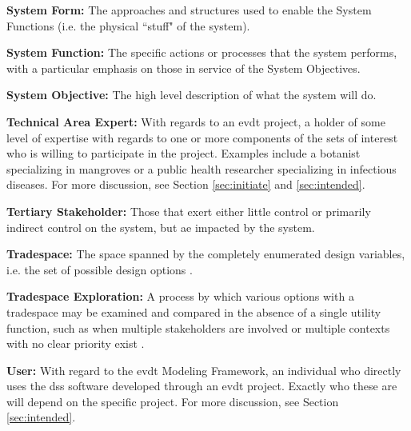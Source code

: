 \textbf{System Form:} The approaches and structures used to enable the System Functions (i.e. the physical ``stuff" of the system).

\textbf{System Function:} The specific actions or processes that the system performs, with a particular emphasis on those in service of the System Objectives.

\textbf{System Objective:} The high level description of what the system will do.

\textbf{Technical Area Expert:} With regards to an \ac{evdt} project, a holder of some level of expertise with regards to one or more components of the \ac{sets} of interest who is willing to participate in the project. Examples include a botanist specializing in mangroves or a public health researcher specializing in infectious diseases. For more discussion, see Section \ref{sec:initiate} and \ref{sec:intended}.

\textbf{Tertiary Stakeholder:} Those that exert either little control or primarily indirect control on the system, but ae impacted by the system.

\textbf{Tradespace:}  The space spanned by the completely enumerated design variables, i.e. the set of possible design options \cite{rossTradespaceExplorationParadigm2005}.

\textbf{Tradespace Exploration:} A process by which various options with a tradespace may be examined and compared in the absence of a single utility function, such as when multiple stakeholders are involved or multiple contexts with no clear priority exist \cite{rossTradespaceExplorationParadigm2005}.

\textbf{User:} With regard to the \ac{evdt} Modeling Framework, an individual who directly uses the \ac{dss} software developed through an \ac{evdt} project. Exactly who these are will depend on the specific project. For more discussion, see Section \ref{sec:intended}.

\clearpage
\newpage
